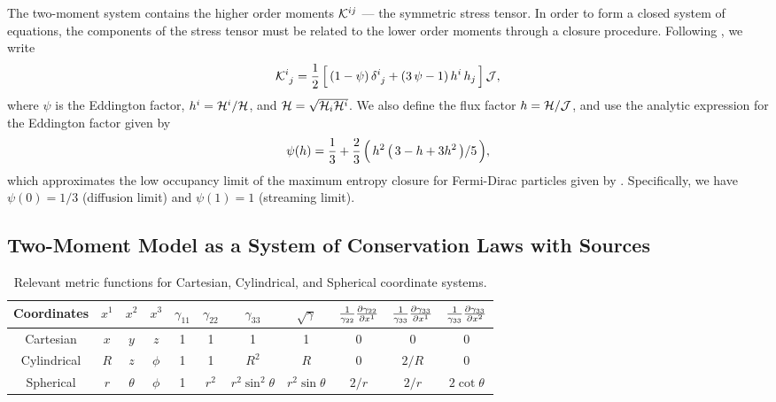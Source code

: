 \documentclass[10pt,preprint]{aastex}
\begin{document}
The two-moment system contains the higher order moments $\mathcal{K}^{ij}$ --- the symmetric stress tensor.  
In order to form a closed system of equations, the components of the stress tensor must be related to the lower order moments through a closure procedure.  
Following \citet{levermore_1984}, we write
\begin{equation}
  \mathcal{K}^{i}_{~j}
  =\frac{1}{2}\,\Big[\,(1-\psi)\,\delta^{i}_{~j}+(3\,\psi-1)\,h^{i}\,h_{j}\,\Big]\,\mathcal{J},
  \label{eq:stressTensor}
\end{equation}
where $\psi$ is the Eddington factor, $h^{i}=\mathcal{H}^{i}/\mathcal{H}$, and $\mathcal{H}=\sqrt{\mathcal{H}_{i}\mathcal{H}^{i}}$.  
We also define the flux factor $h=\mathcal{H}/\mathcal{J}$, and use the analytic expression for the Eddington factor \citep{minerbo_1978} given by 
\begin{equation}
  \psi(h)=\frac{1}{3}+\frac{2}{3}\,\Big(\,h^{2}\,\big(\,3-h+3h^{2}\,\big)/5\,\Big),
  \label{eq:eddingtonFactor}
\end{equation}
which approximates the low occupancy limit of the maximum entropy closure for Fermi-Dirac particles given by \citet{cernohorskyBludman_1994}.  
Specifically, we have $\psi(0)=1/3$ (diffusion limit) and $\psi(1)=1$ (streaming limit).  

\subsection{Two-Moment Model as a System of Conservation Laws with Sources}

\begin{table}
  \begin{center}
  \caption{Relevant metric functions for Cartesian, Cylindrical, and Spherical coordinate systems.\label{tab:metricFunctions}}
  \begin{tabular}{ccccccccccc}
    \midrule
    Coordinates & $x^{1}$ & $x^{2}$ & $x^{3}$ & $\gamma_{11}$ & $\gamma_{22}$ & $\gamma_{33}$ & $\sqrt{\gamma}$
    & $\frac{1}{\gamma_{22}}\frac{\partial \gamma_{22}}{\partial x^{1}}$ & $\frac{1}{\gamma_{33}}\frac{\partial \gamma_{33}}{\partial x^{1}}$ & $\frac{1}{\gamma_{33}}\frac{\partial \gamma_{33}}{\partial x^{2}}$ \\
    \midrule
    \midrule
    Cartesian & $x$ & $y$ & $z$ & 1 & 1 & 1 & 1 & 0 & 0 & 0 \\
    Cylindrical & $R$ & $z$ & $\phi$ & 1 & 1 & $R^{2}$ & $R$ & 0 & $2/R$ & 0 \\
    Spherical & $r$ & $\theta$ & $\phi$ & 1 & $r^{2}$ & $r^{2}\sin^{2}\theta$ & $r^{2}\sin\theta$ & $2/r$ & $2/r$ & $2\cot\theta$ \\
    \midrule
    \midrule
  \end{tabular}
  \end{center}
\end{table}
\end{document}
